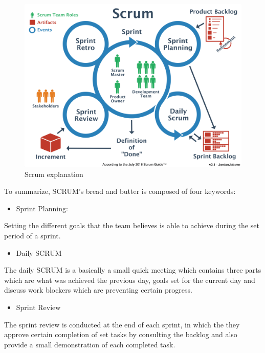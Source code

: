 \documentclass[]{report}
\begin{document}
\begin{figure}[H]
	\begin{center}
	\includegraphics[width=150mm]{scrum.png}
	\caption{Scrum explanation}
\end{center}
\end{figure}


To summarize, SCRUM’s bread and butter is composed of four keywords:
\begin{itemize}
	\item Sprint Planning:
\end{itemize}

Setting the different goals that the team believes is able to achieve during the set
period of a sprint.

\begin{itemize}
	\item Daily SCRUM
\end{itemize}

The daily SCRUM is a basically a small quick meeting which contains three
parts which are what was achieved the previous day, goals set for the current
day and discuss work blockers which are preventing certain progress.

\begin{itemize}
	\item Sprint Review
\end{itemize}

The sprint review is conducted at the end of each sprint, in which the they
approve certain completion of set tasks by consulting the backlog and also
provide a small demonstration of each completed task.
\end{document}
